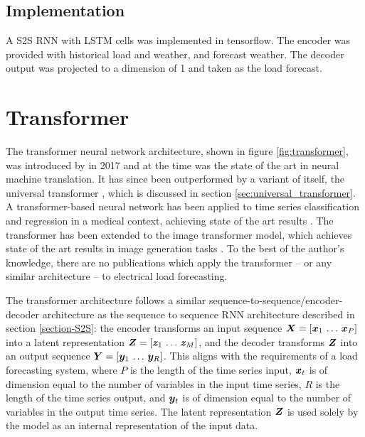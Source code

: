 \subsection{Implementation}
A S2S RNN with LSTM cells was implemented in tensorflow.
The encoder was provided with historical load and weather, and forecast weather.
The decoder output was projected to a dimension of 1 and taken as the load forecast.

\section{Transformer} \label{sec:transformer}
The transformer neural network architecture, shown in figure \ref{fig:transformer}, was introduced by \citet{Vaswani2017} in 2017 and at the time was the state of the art in neural machine translation.
It has since been outperformed by a variant of itself, the universal transformer \cite{Dehghani2018}, which is discussed in section \ref{sec:universal_transformer}.
A transformer-based neural network has been applied to time series classification and regression in a medical context, achieving state of the art results \cite{Song2017}.
The transformer has been extended to the image transformer model, which achieves state of the art results in image generation tasks \cite{Parmar2018}.
To the best of the author's knowledge, there are no publications which apply the transformer -- or any similar architecture -- to electrical load forecasting.

The transformer architecture follows a similar sequence-to-sequence/encoder-decoder architecture as the sequence to sequence RNN architecture described in section \ref{section-S2S}: the encoder transforms an input sequence ${\bm{X}} = [{\bm{x}}_1 \, \ldots \, {\bm{x}}_P]$ into a latent representation ${\bm{Z}} = [{\bm{z}}_1 \, \ldots \, {\bm{z}}_M]$, and the decoder transforms ${\bm{Z}}$ into an output sequence ${\bm{Y}} = [{\bm{y}}_1 \, \ldots \, {\bm{y}}_R]$.
This aligns with the requirements of a load forecasting system, where $P$ is the length of the time series input, ${\bm{x}}_t$ is of dimension equal to the number of variables in the input time series, $R$ is the length of the time series output, and ${\bm{y}}_t$ is of dimension equal to the number of variables in the output time series.
The latent representation ${\bm{Z}}$ is used solely by the model as an internal representation of the input data.


